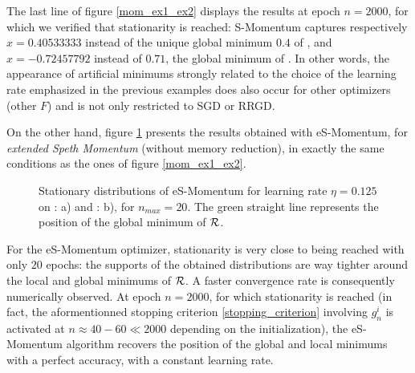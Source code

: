 \documentclass[article,authoryear,jmlmc]{beg_32}             %
\begin{document}
  The last line of figure \ref{mom_ex1_ex2} displays the results at epoch $n=2000$, for which we verified that stationarity is reached:  S-Momentum captures respectively
  $x=0.40533333$ instead of the unique global minimum $0.4$ of \exOne, 
  and $x=-0.72457792$ instead of $0.71$, the global minimum of \exTwo. 
  In other words, the appearance of artificial minimums strongly related to the choice of the learning rate emphasized in the previous examples does also occur for other optimizers
  (other $F$) and is not only restricted to SGD or RRGD. 

  On the other hand, figure \ref{speth_mom_ex1_ex2} presents the results obtained with eS-Momentum, for {\em extended Speth Momentum} {(without memory reduction)}, in exactly the same conditions as the ones of figure \ref{mom_ex1_ex2}. 
\begin{figure}[!h]
	\centering
	\scalebox{0.60}{}
	\scalebox{0.60}{}
        \caption{Stationary distributions of eS-Momentum for learning rate $\eta=0.125$ on \exOne: a) and \exTwo: b), for $n_{max}=20$. The green straight line represents the position of the global minimum of $\mathcal{R}$.}
	\label{speth_mom_ex1_ex2}
\end{figure}
For the eS-Momentum optimizer, stationarity is very close to being reached with only $20$ epochs: the supports of the obtained distributions are way tighter around the local and
global minimums of $\mathcal{R}$. A faster convergence rate is consequently numerically observed.  
  At epoch $n=2000$, for which stationarity is reached (in fact, the aformentionned stopping criterion \eqref{stopping_criterion} involving $g_n^i$ is activated at $n\approx 40 - 60 \ll 2000$ depending on the
  initialization), the eS-Momentum algorithm recovers the 
  position of the global and local minimums with a perfect accuracy, with a constant learning rate. 
\end{document}
